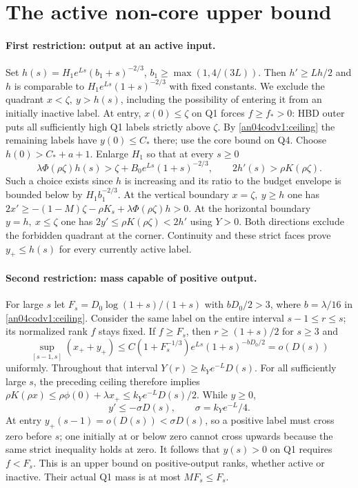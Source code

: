 \documentclass[11pt]{article}
\begin{document}
\section{The active non-core upper bound}
\paragraph{First restriction: output at an active input.}
Set $h(s)=H_1e^{Ls}(b_1+s)^{-2/3}$, $b_1\ge\max(1,4/(3L))$.
Then $h'\ge Lh/2$ and $h$ is comparable to
$H_1 e^{Ls}(1+s)^{-2/3}$ with fixed constants.
We exclude the quadrant $x<\zeta,\ y>h(s)$, including the possibility
of entering it from an initially inactive label.
At entry, $x(0)\le\zeta$ on Q1 forces $f\ge f_*>0$: HBD outer
puts all sufficiently high Q1 labels strictly above $\zeta$.
By \eqref{an04codv1:ceiling} the remaining labels have $y(0)\le C_*$
there; use the core bound on Q4. Choose $h(0)>C_*+a+1$.
Enlarge $H_1$ so that at every $s\ge0$
\[
 \lambda\Phi(\rho\zeta) h(s)>\zeta+B_0e^{Ls}(1+s)^{-2/3},
 \qquad 2h'(s)>\rho K(\rho\zeta).
\]
Such a choice exists since $h$ is increasing and its ratio to the
budget envelope is bounded below by $H_1 b_1^{-2/3}$.
At the vertical boundary $x=\zeta,\ y\ge h$ one has
$2x'\ge-(1-M)\zeta-\rho K_s+\lambda\Phi(\rho\zeta)h>0$.
At the horizontal boundary $y=h,\ x\le\zeta$ one has
$2y'\le\rho K(\rho\zeta)<2h'$ using $Y>0$.
Both directions exclude the forbidden quadrant at the corner.
Continuity and these strict faces prove $y_+\le h(s)$ for every
currently active label.

\paragraph{Second restriction: mass capable of positive output.}
For large $s$ let $F_s=D_0\log(1+s)/(1+s)$ with $bD_0/2>3$,
where $b=\lambda/16$ in \eqref{an04codv1:ceiling}.
Consider the same label on the entire interval $s-1\le r\le s$;
its normalized rank $f$ stays fixed. If $f\ge F_s$, then
$r\ge(1+s)/2$ for $s\ge3$ and
\[
 \sup_{[s-1,s]}(x_++y_+)
 \le C(1+F_s^{-1/3}) e^{Ls}(1+s)^{-bD_0/2}=o(D(s))
\]
uniformly. Throughout that interval $Y(r)\ge k_Y e^{-L}D(s)$.
For all sufficiently large $s$, the preceding ceiling therefore
implies $\rho K(\rho x)\le\rho\phi(0)+\lambda x_+
\le k_Y e^{-L}D(s)/2$. While $y\ge0$,
\[
 y'\le-\sigma D(s),\qquad \sigma=k_Ye^{-L}/4.
\]
At entry $y_+(s-1)=o(D(s))<\sigma D(s)$, so a positive label
must cross zero before $s$; one initially at or below zero cannot
cross upwards because the same strict inequality holds at zero.
It follows that $y(s)>0$ on Q1 requires $f<F_s$.
This is an upper bound on positive-output ranks, whether active
or inactive. Their actual Q1 mass is at most $MF_s\le F_s$.
\end{document}
